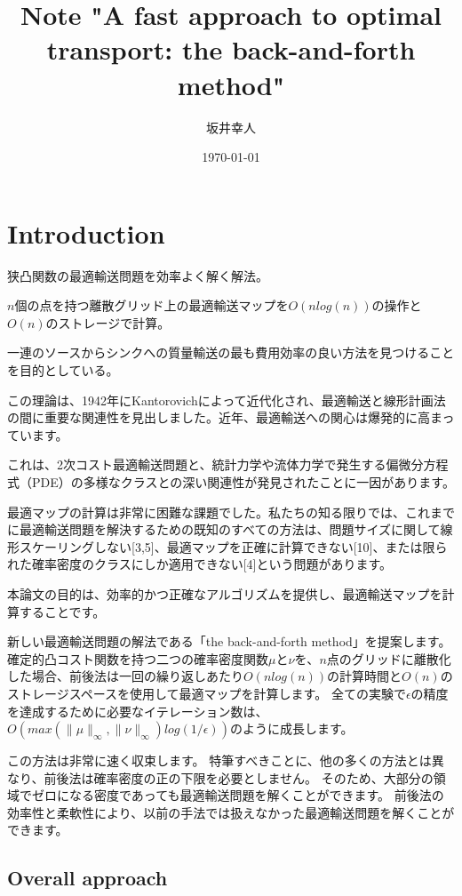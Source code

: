 \documentclass{jsarticle}
\title{Note  "A fast approach to optimal transport: the back-and-forth method"}
\author{坂井幸人}
\date{\today}
\theoremstyle{definition}
\begin{document}
\maketitle

\section{Introduction}
狭凸関数の最適輸送問題を効率よく解く解法。

$n$個の点を持つ離散グリッド上の最適輸送マップを$O(n log(n))$の操作と$O(n)$のストレージで計算。

一連のソースからシンクへの質量輸送の最も費用効率の良い方法を見つけることを目的としている。

この理論は、1942年にKantorovichによって近代化され、最適輸送と線形計画法の間に重要な関連性を見出しました。近年、最適輸送への関心は爆発的に高まっています。

これは、2次コスト最適輸送問題と、統計力学や流体力学で発生する偏微分方程式（PDE）の多様なクラスとの深い関連性が発見されたことに一因があります。

最適マップの計算は非常に困難な課題でした。私たちの知る限りでは、これまでに最適輸送問題を解決するための既知のすべての方法は、問題サイズに関して線形スケーリングしない[3,5]、最適マップを正確に計算できない[10]、または限られた確率密度のクラスにしか適用できない[4]という問題があります。\par
\vspace\baselineskip 

本論文の目的は、効率的かつ正確なアルゴリズムを提供し、最適輸送マップを計算することです。

新しい最適輸送問題の解法である「the back-and-forth method」を提案します。
確定的凸コスト関数を持つ二つの確率密度関数$\mu$と$\nu$を、$n$点のグリッドに離散化した場合、前後法は一回の繰り返しあたり$O(n log(n))$の計算時間と$O(n)$のストレージスペースを使用して最適マップを計算します。
全ての実験で$\epsilon$の精度を達成するために必要なイテレーション数は、$O(max( \|\mu\|_\infty, \|\nu\|_\infty) log(1/\epsilon))$のように成長します。

この方法は非常に速く収束します。
\color{red}
特筆すべきことに、他の多くの方法とは異なり、前後法は確率密度の正の下限を必要としません。
そのため、大部分の領域でゼロになる密度であっても最適輸送問題を解くことができます。
前後法の効率性と柔軟性により、以前の手法では扱えなかった最適輸送問題を解くことができます。

\color{black}


\subsection{Overall approach}
\end{document}
